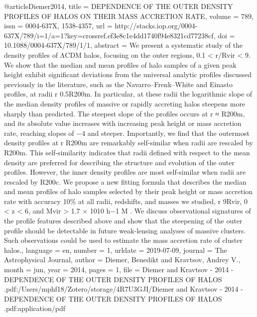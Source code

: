 {@article{Diemer2014,
	title = {{DEPENDENCE} {OF} {THE} {OUTER} {DENSITY} {PROFILES} {OF} {HALOS} {ON} {THEIR} {MASS} {ACCRETION} {RATE}},
	volume = {789},
	issn = {0004-637X, 1538-4357},
	url = {http://stacks.iop.org/0004-637X/789/i=1/a=1?key=crossref.ef3e8c1e4dd1740f94e8321cd77238cf},
	doi = {10.1088/0004-637X/789/1/1},
	abstract = {We present a systematic study of the density proﬁles of ΛCDM halos, focusing on the outer regions, 0.1 {\textless} r/Rvir {\textless} 9. We show that the median and mean proﬁles of halo samples of a given peak height exhibit signiﬁcant deviations from the universal analytic proﬁles discussed previously in the literature, such as the Navarro–Frenk–White and Einasto proﬁles, at radii r 0.5R200m. In particular, at these radii the logarithmic slope of the median density proﬁles of massive or rapidly accreting halos steepens more sharply than predicted. The steepest slope of the proﬁles occurs at r ≈ R200m, and its absolute value increases with increasing peak height or mass accretion rate, reaching slopes of −4 and steeper. Importantly, we ﬁnd that the outermost density proﬁles at r R200m are remarkably self-similar when radii are rescaled by R200m. This self-similarity indicates that radii deﬁned with respect to the mean density are preferred for describing the structure and evolution of the outer proﬁles. However, the inner density proﬁles are most self-similar when radii are rescaled by R200c. We propose a new ﬁtting formula that describes the median and mean proﬁles of halo samples selected by their peak height or mass accretion rate with accuracy 10\% at all radii, redshifts, and masses we studied, r 9Rvir, 0 {\textless} z {\textless} 6, and Mvir {\textgreater} 1.7 × 1010 h−1 M . We discuss observational signatures of the proﬁle features described above and show that the steepening of the outer proﬁle should be detectable in future weak-lensing analyses of massive clusters. Such observations could be used to estimate the mass accretion rate of cluster halos.},
	language = {en},
	number = {1},
	urldate = {2019-07-09},
	journal = {The Astrophysical Journal},
	author = {Diemer, Benedikt and Kravtsov, Andrey V.},
	month = jun,
	year = {2014},
	pages = {1},
	file = {Diemer and Kravtsov - 2014 - DEPENDENCE OF THE OUTER DENSITY PROFILES OF HALOS .pdf:/Users/mphf18/Zotero/storage/4R7U3GJI/Diemer and Kravtsov - 2014 - DEPENDENCE OF THE OUTER DENSITY PROFILES OF HALOS .pdf:application/pdf}
}

}
